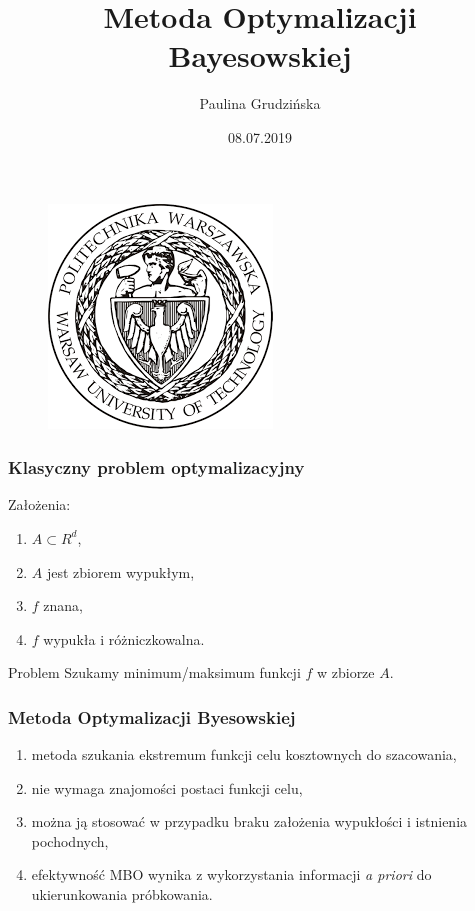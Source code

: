 \documentclass[handout]{beamer}
\begin{document}
\author{Paulina Grudzińska}

\title{Metoda Optymalizacji Bayesowskiej}
\date{08.07.2019}

\begin{frame} %
\titlepage%
\vspace{-0.7cm}
\begin{center}
\begin{figure}
\includegraphics[scale=0.25]{logo.png}
\end{figure}
\end{center}
\end{frame}



\begin{frame}
\frametitle{Klasyczny problem optymalizacyjny}
\begin{block}{}
Założenia:
\begin{enumerate}
\item $A \subset R^d$,
\item $A$ jest zbiorem wypukłym, 
\item $f$ znana, 
\item $f$ wypukła i różniczkowalna. 
\end{enumerate} 

\end{block}
\pause
\begin{block}{Problem}
Szukamy minimum/maksimum funkcji $f$ w zbiorze $A$.
\end{block}
\end{frame}

\begin{frame}
\frametitle{Metoda Optymalizacji Byesowskiej}
\begin{block}{}
\begin{enumerate}
\item metoda szukania ekstremum funkcji celu kosztownych do szacowania,
\item nie wymaga znajomości postaci funkcji celu, 
\item można ją stosować w przypadku braku założenia wypukłości i istnienia pochodnych, 
\item efektywność MBO wynika z wykorzystania informacji \textit{a priori} do ukierunkowania próbkowania. 
\end{enumerate}
\end{block}
\end{frame}
\end{document}
